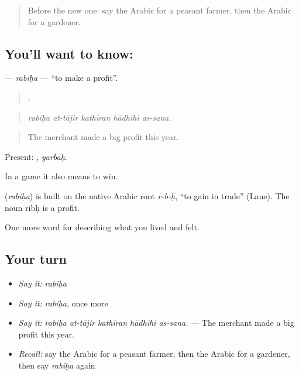 \label{lesson:AR-C527-rabiha}



\begin{quote}
Before the new one: say the Arabic for a peasant farmer, then the Arabic for a gardener.
\end{quote}

\subsection*{You'll want to know: }
\textbf{} — \emph{rabiḥa} — \textquotedblleft{}to make a profit\textquotedblright{}.

\begin{quote}
    .
\end{quote}

\begin{quote}
\emph{rabiḥa at-tājir kathīran hādhihi as-sana.}
\end{quote}

\begin{quote}
The merchant made a big profit this year.
\end{quote}

Present: , \emph{yarbaḥ}.

In a game it also means to win.

\begin{cousinweb}
\textbf{} (\emph{rabiḥa}) is built on the native Arabic root \emph{r-b-ḥ}, \textquotedblleft{}to gain in trade\textquotedblright{} (Lane). The noun ribḥ is a profit.
\end{cousinweb}

\begin{grammarlens}[title={What you've built}]
One more word for describing what you lived and felt.
\end{grammarlens}

\subsection*{Your turn}
\begin{itemize}
\raggedright
  \item \emph{Say it:} \emph{rabiḥa}
  \item \emph{Say it:} \emph{rabiḥa}, once more
  \item \emph{Say it:} \emph{rabiḥa at-tājir kathīran hādhihi as-sana.} — The merchant made a big profit this year.
  \item \emph{Recall:} say the Arabic for a peasant farmer, then the Arabic for a gardener, then say \emph{rabiḥa} again
\end{itemize}

